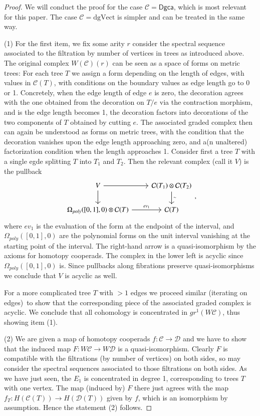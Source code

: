 \documentclass[a4paper]{amsart}
\theoremstyle{plain}
\theoremstyle{definition}
\newcommand{\op}{\mathcal}
\newcommand{\dgca}{\mathsf{Dgca}}
\newcommand{\mC}{{\mathcal{C}}}
\newcommand{\dgVect}{\mathrm{dgVect}}
\newcommand{\gr}{\mathit{gr}}
\begin{document}
\begin{proof}
We will conduct the proof for the case $\mC=\dgca$, which is most relevant for this paper. The case $\mC=\dgVect$ is simpler and can be treated in the same way.

 (1) For the first item, we fix some arity $r$ consider the spectral sequence associated to the filtration by number of vertices in trees as introduced above.
 The original complex $W(\op C)(r)$ can be seen as a space of forms on metric trees: For each tree $T$ we assign a form depending on the length of edges, with values in $\op C(T)$, with conditions on the boundary values as edge length go to 0 or 1. Concretely, when the edge length of edge $e$ is zero, the decoration agrees with the one obtained from the decoration on $T/e$ via the contraction morphism, and is the edge length becomes 1, the decoration factors into decorations of the two components of $T$ obtained by cutting $e$. 
 The associated graded complex then can again be understood as forms on metric trees, with the condition that the decoration vanishes upon the edge length approaching zero, and a(n unaltered) factorization condition when the length approaches 1. 
 Consider first a tree $T$ with a single egde splitting $T$ into $T_1$ and $T_2$.
 Then the relevant complex (call it $V$) is the pullback
 \[
  \begin{tikzcd}
  V  \ar{r}\ar{d} 
  & 
  \op C(T_1) \otimes \op C(T_2) \ar{d}{\sim}
  \\
   \Omega_{poly}([0,1],0)\otimes \op C(T) \ar{r}{\mathit{ev}_1}
   & 
   \op C(T)
  \end{tikzcd},
 \]
where $\mathit{ev}_1$ is the evaluation of the form at the endpoint of the interval, and $\Omega_{poly}([0,1],0)$ are the polynomial forms on the unit interval vanishing at the starting point of the interval.
The right-hand arrow is a quasi-isomorphism by the axioms for homotopy cooperads.
The complex in the lower left is acyclic since $\Omega_{poly}([0,1],0)$ is.
Since pullbacks along fibrations preserve quasi-isomorphisms we conclude that $V$ is acyclic as well.

For a more complicated tree $T$ with $>1$ edges we proceed similar (iterating on edges) to show that the corresponding piece of the associated graded complex is acyclic. We conclude that all cohomology is concentrated in $\gr^1(W\op C)$, thus showing item (1).
 
(2) We are given a map of homotopy cooperads $f:\op C\to \op D$ and we have to show that the induced map $F: W\op C\to W\op D$ is a quasi-isomorphism.
Clearly $F$ is compatible with the filtrations (by number of vertices) on both sides, so may consider the spectral sequences associated to those filtrations on both sides.
As we have just seen, the $E_1$ is concentrated in degree 1, corresponding to trees $T$ with one vertex.
The map (induced by) $F$ there just agrees with the map $f_T: H(\op C(T))\to H(\op D(T))$ given by $f$, which is an isomorphism by assumption. Hence the statement (2) follows.


\end{proof}
\end{document}
